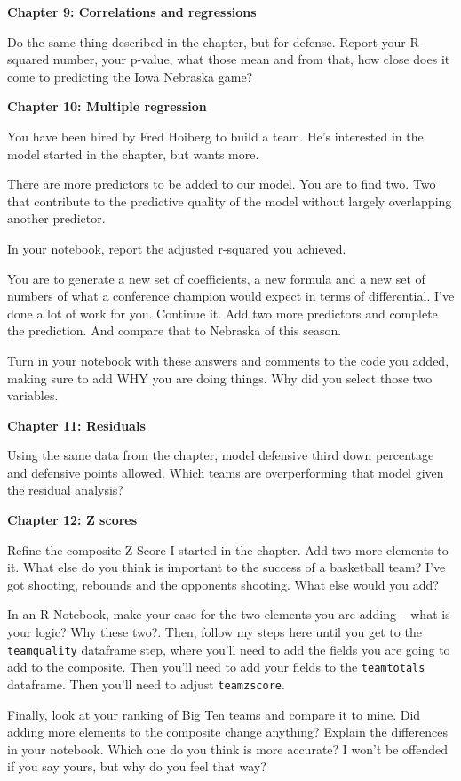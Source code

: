 \documentclass[]{book}
\begin{document}
\textbf{Chapter 9: Correlations and regressions}

Do the same thing described in the chapter, but for defense. Report your R-squared number, your p-value, what those mean and from that, how close does it come to predicting the Iowa Nebraska game?

\textbf{Chapter 10: Multiple regression}

You have been hired by Fred Hoiberg to build a team. He's interested in the model started in the chapter, but wants more.

There are more predictors to be added to our model. You are to find two. Two that contribute to the predictive quality of the model without largely overlapping another predictor.

In your notebook, report the adjusted r-squared you achieved.

You are to generate a new set of coefficients, a new formula and a new set of numbers of what a conference champion would expect in terms of differential. I've done a lot of work for you. Continue it. Add two more predictors and complete the prediction. And compare that to Nebraska of this season.

Turn in your notebook with these answers and comments to the code you added, making sure to add WHY you are doing things. Why did you select those two variables.

\textbf{Chapter 11: Residuals}

Using the same data from the chapter, model defensive third down percentage and defensive points allowed. Which teams are overperforming that model given the residual analysis?

\textbf{Chapter 12: Z scores}

Refine the composite Z Score I started in the chapter. Add two more elements to it. What else do you think is important to the success of a basketball team? I've got shooting, rebounds and the opponents shooting. What else would you add?

In an R Notebook, make your case for the two elements you are adding -- what is your logic? Why these two?. Then, follow my steps here until you get to the \texttt{teamquality} dataframe step, where you'll need to add the fields you are going to add to the composite. Then you'll need to add your fields to the \texttt{teamtotals} dataframe. Then you'll need to adjust \texttt{teamzscore}.

Finally, look at your ranking of Big Ten teams and compare it to mine. Did adding more elements to the composite change anything? Explain the differences in your notebook. Which one do you think is more accurate? I won't be offended if you say yours, but why do you feel that way?
\end{document}
